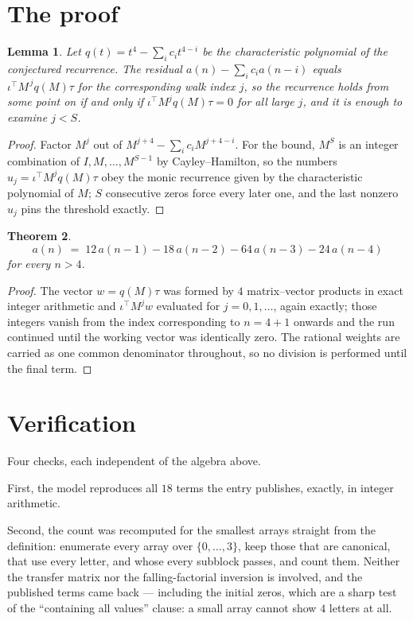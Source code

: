 \documentclass[11pt,a4paper]{article}
\theoremstyle{plain}
\newtheorem{theorem}{Theorem}
\newtheorem{lemma}[theorem]{Lemma}
\theoremstyle{definition}
\begin{document}
\section{The proof}

\begin{lemma}\label{lem:crit}
Let $q(t)=t^{4}-\sum_i c_it^{4-i}$ be the characteristic polynomial of the
conjectured recurrence. The residual $a(n)-\sum_ic_ia(n-i)$ equals
$\iota^{\!\top}M^{\,j}q(M)\tau$ for the corresponding walk index $j$, so the recurrence
holds from some point on if and only if $\iota^{\!\top}M^{j}q(M)\tau=0$ for all large $j$,
and it is enough to examine $j<S$.
\end{lemma}

\begin{proof}
Factor $M^{j}$ out of $M^{j+4}-\sum_ic_iM^{j+4-i}$. For the bound, $M^{S}$
is an integer combination of $I,M,\dots,M^{S-1}$ by Cayley--Hamilton, so the numbers
$u_j=\iota^{\!\top}M^{j}q(M)\tau$ obey the monic recurrence given by the characteristic
polynomial of $M$; $S$ consecutive zeros force every later one, and the last nonzero $u_j$
pins the threshold exactly.
\end{proof}

\begin{theorem}
\[
a(n)\;=\;12\,a(n-1) - 18\,a(n-2) - 64\,a(n-3) - 24\,a(n-4)
\]
for every $n>4$.
\end{theorem}

\begin{proof}
The vector $w=q(M)\tau$ was formed by $4$ matrix--vector products in exact integer
arithmetic and $\iota^{\!\top}M^{j}w$ evaluated for $j=0,1,\dots$, again exactly; those
integers vanish from the index corresponding to $n=4+1$ onwards and the run continued
until the working vector was identically zero. The rational weights are carried as one common
denominator throughout, so no division is performed until the final term.
\end{proof}

\section{Verification}

Four checks, each independent of the algebra above.

First, the model reproduces all $18$ terms the entry publishes, exactly, in integer
arithmetic.

Second, the count was recomputed for the smallest arrays straight from the definition:
enumerate every array over $\{0,\dots,3\}$, keep those that are canonical, that use every
letter, and whose every subblock passes, and count them. Neither the transfer matrix nor the
falling-factorial inversion is involved, and the published terms came back --- including the
initial zeros, which are a sharp test of the ``containing all values'' clause: a small array
cannot show $4$ letters at all.
\end{document}
